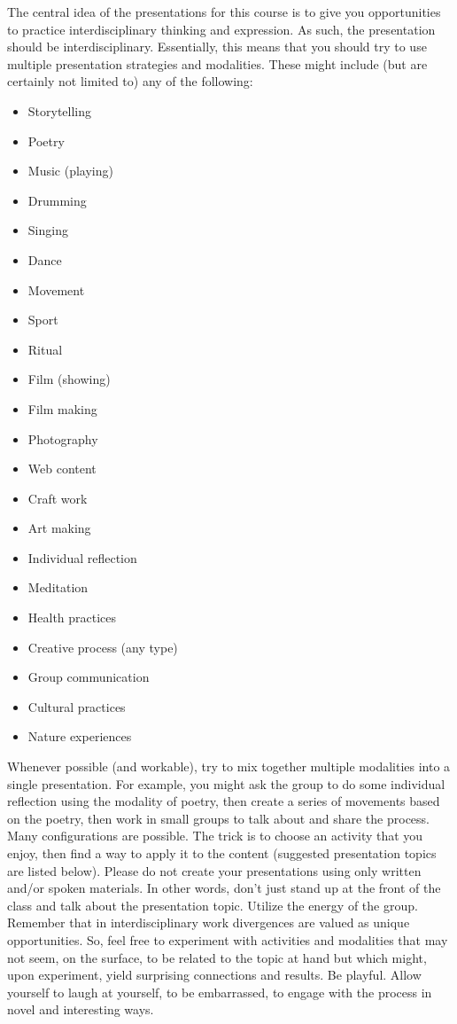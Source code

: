 \documentclass[letterpaper,10pt,headsepline]{scrreprt}
\begin{document}
The central idea of the presentations for this course is to give you
 opportunities to practice interdisciplinary thinking and expression.
 As such, the presentation should be interdisciplinary. Essentially,
 this means that you should try to use multiple presentation
 strategies and modalities. These might include (but are certainly not
 limited to) any of the following:

 \begin{itemize}
 \item Storytelling
 \item Poetry
 \item Music (playing)
 \item Drumming
 \item Singing
 \item Dance
 \item Movement
 \item Sport
 \item Ritual
 \item Film (showing)
 \item Film making
 \item Photography
 \item Web content
 \item Craft work
 \item Art making
 \item Individual reflection
 \item Meditation
 \item Health practices
 \item Creative process (any type)
 \item Group communication
 \item Cultural practices
 \item Nature experiences
 \end{itemize}

 Whenever possible (and workable), try to mix together multiple
 modalities into a single presentation. For example, you might ask the
 group to do some individual reflection using the modality of poetry,
 then create a series of movements based on the poetry, then work in
 small groups to talk about and share the process. Many configurations
 are possible. The trick is to choose an activity that you enjoy, then
 find a way to apply it to the content (suggested presentation topics
 are listed below). Please do not create your presentations using only
 written and/or spoken materials. In other words, don't just stand up
 at the front of the class and talk about the presentation topic.
 Utilize the energy of the group. Remember that in interdisciplinary
 work divergences are valued as unique opportunities. So, feel free to
 experiment with activities and modalities that may not seem, on the
 surface, to be related to the topic at hand but which might, upon
 experiment, yield surprising connections and results. Be playful.
 Allow yourself to laugh at yourself, to be embarrassed, to engage
 with the process in novel and interesting ways.
\end{document}
